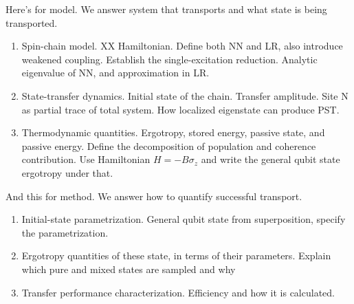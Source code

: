\documentclass[../../../main.tex]{subfiles}
\begin{document}
Here's for model. We answer system that transports and what state is being transported.
\begin{enumerate}
    \item Spin-chain model. 
    XX Hamiltonian.
    Define both NN and LR, also introduce weakened coupling. 
    Establish the single-excitation reduction.
    Analytic eigenvalue of NN, and approximation in LR.
    \item State-transfer dynamics. 
    Initial state of the chain. 
    Transfer amplitude. 
    Site N as partial trace of total system.
    How localized eigenstate can produce PST.
    \item Thermodynamic quantities.
    Ergotropy, stored energy, passive state, and passive energy.
    Define the decomposition of population and coherence contribution.
    Use Hamiltonian $H=-B\sigma_z$ and write the general qubit state ergotropy under that.
\end{enumerate}

And this for method. We answer how to quantify successful transport.
\begin{enumerate}
  \item Initial-state parametrization.
  General qubit state from superposition, specify the parametrization. 
  \item Ergotropy quantities of these state, in terms of their parameters.
  Explain which pure and mixed states are sampled and why
  \item Transfer performance characterization.
  Efficiency and how it is calculated.
\end{enumerate}
\end{document}
